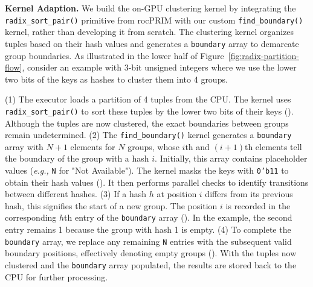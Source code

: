 \noindent
\textbf{Kernel Adaption.}
We build the on-GPU clustering kernel by integrating the \texttt{radix\_sort\_pair()} primitive from rocPRIM with our custom \texttt{find\_boundary()} kernel, rather than developing it from scratch.
The clustering kernel organizes tuples based on their hash values and generates a \texttt{boundary} array to demarcate group boundaries.
As illustrated in the lower half of Figure~\ref{fig:radix-partition-flow}, consider an example with 3-bit unsigned integers where we use the lower two bits of the keys as hashes to cluster them into 4 groups. 

(1) The executor loads a partition of 4 tuples from the CPU. The kernel uses \texttt{radix\_sort\_pair()} to sort these tuples by the lower two bits of their keys ().
Although the tuples are now clustered, the exact boundaries between groups remain undetermined.
(2) The \texttt{find\_boundary()} kernel generates a \texttt{boundary} array with $N + 1$ elements for $N$ groups, whose $i$th and $(i+1)$th elements tell the boundary of the group with a hash $i$.
Initially, this array contains placeholder values (\textit{e.g.,} \texttt{N} for "Not Available"). 
The kernel masks the keys with \texttt{0'b11} to obtain their hash values (). 
It then performs parallel checks to identify transitions between different hashes.
(3) If a hash $h$ at position $i$ differs from its previous hash, this signifies the start of a new group. 
The position $i$ is recorded in the corresponding $h$th entry of the \texttt{boundary} array (). 
In the example, the second entry remains 1 because the group with hash 1 is empty.
(4) To complete the \texttt{boundary} array, we replace any remaining \texttt{N} entries with the subsequent valid boundary positions, effectively denoting empty groups (). 
With the tuples now clustered and the \texttt{boundary} array populated, the results are stored back to the CPU for further processing.


